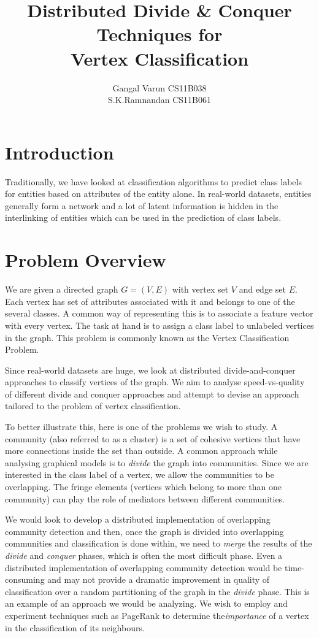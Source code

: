 \documentclass{article}
\begin{document}
\title{\textbf{Distributed Divide \& Conquer Techniques for \\Vertex Classification}}
\author{ Gangal Varun CS11B038 \\
		 S.K.Ramnandan CS11B061\\
[0.2in]
}
\date{}
\maketitle
\section*{Introduction}
Traditionally, we have looked at classification algorithms to predict class labels for entities based on attributes of the entity alone. In real-world datasets, entities generally form a network and a lot of latent information is hidden in the interlinking of entities which can be used in the prediction of class labels. 

\section*{Problem Overview}
We are given a directed graph $G=(V,E)$ with vertex set $V$ and edge set $E$. Each vertex has set of attributes associated with it and belongs to one of the several classes. A common way of representing this is to associate a feature vector with every vertex. The task at hand is to assign a class label to unlabeled vertices in the graph. This problem is commonly known as the Vertex Classification Problem. 

Since real-world datasets are huge, we look at distributed divide-and-conquer approaches to classify vertices of the graph. We aim to analyse speed-vs-quality of different divide and conquer approaches and attempt to devise an approach tailored to the problem of vertex classification. 

To better illustrate this, here is one of the problems we wish to study. A community (also referred to as a cluster) is a set of cohesive vertices that have more connections inside the set than outside. A common approach while analysing graphical models is to {\it divide} the graph into communities. Since we are interested in the class label of a vertex, we allow the communities to be overlapping. The fringe elements (vertices which belong to more than one community) can play the role of mediators between different communities. 

We would look to develop a distributed implementation of overlapping community detection and then, once the graph is divided into overlapping communities and classification is done within, we need to {\it merge} the results of the {\it divide} and {\it conquer} phases, which is often the most difficult phase. Even a distributed implementation of overlapping community detection would be time-consuming and may not provide a dramatic improvement in quality of classification over a random partitioning of the graph in the {\it divide} phase. This is an example of an approach we would be analyzing. We wish to employ and experiment techniques such as PageRank to determine the{\it importance} of a vertex in the classification of its neighbours.
\end{document}
